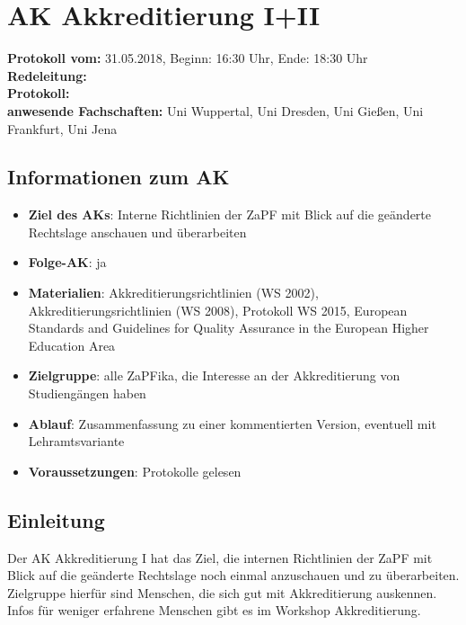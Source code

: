 

\section{AK Akkreditierung I+II}

  \textbf{Protokoll vom:} 31.05.2018, %
  Beginn: 16:30 Uhr, %
  Ende: 18:30 Uhr \\ %
  \textbf{Redeleitung:} \\ %
  \textbf{Protokoll:} \\ %
  \textbf{anwesende Fachschaften:} Uni Wuppertal, Uni Dresden, Uni Gießen, Uni Frankfurt, Uni Jena

  \subsection*{Informationen zum AK}
    \begin{itemize}
    	\item \textbf{Ziel des AKs}: Interne Richtlinien der ZaPF mit Blick auf die geänderte Rechtslage anschauen und überarbeiten
    	\item \textbf{Folge-AK}: ja
      \item \textbf{Materialien}: Akkreditierungsrichtlinien (WS 2002), Akkreditierungsrichtlinien (WS 2008), Protokoll WS 2015, European Standards and Guidelines for Quality Assurance in the European Higher Education Area
    	\item \textbf{Zielgruppe}: alle ZaPFika, die Interesse an der Akkreditierung von Studiengängen haben
    	\item \textbf{Ablauf}: Zusammenfassung zu einer kommentierten Version, eventuell mit Lehramtsvariante
    	\item \textbf{Voraussetzungen}: Protokolle gelesen
    \end{itemize}

  \subsection*{Einleitung}
    Der AK Akkreditierung I hat das Ziel, die internen Richtlinien der ZaPF mit Blick auf die geänderte Rechtslage noch einmal anzuschauen und zu überarbeiten. Zielgruppe hierfür sind Menschen, die sich gut mit Akkreditierung auskennen. \\

Infos für weniger erfahrene Menschen gibt es im Workshop Akkreditierung. \\

